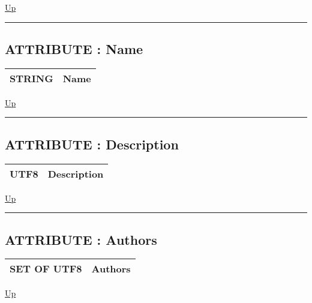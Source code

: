 \hyperlink{ecldoc:BundleBase}{Up}

\par


\rule{\textwidth}{0.4pt}
\subsection*{ATTRIBUTE : Name}
\hypertarget{ecldoc:bundlebase.name}{}

{\renewcommand{\arraystretch}{1.5}
\begin{tabularx}{\textwidth}{|>{\raggedright\arraybackslash}l|X|}
\hline
\hspace{0pt}STRING & Name \\
\hline
\end{tabularx}
}

\hyperlink{ecldoc:BundleBase}{Up}

\par


\rule{\textwidth}{0.4pt}
\subsection*{ATTRIBUTE : Description}
\hypertarget{ecldoc:bundlebase.description}{}

{\renewcommand{\arraystretch}{1.5}
\begin{tabularx}{\textwidth}{|>{\raggedright\arraybackslash}l|X|}
\hline
\hspace{0pt}UTF8 & Description \\
\hline
\end{tabularx}
}

\hyperlink{ecldoc:BundleBase}{Up}

\par


\rule{\textwidth}{0.4pt}
\subsection*{ATTRIBUTE : Authors}
\hypertarget{ecldoc:bundlebase.authors}{}

{\renewcommand{\arraystretch}{1.5}
\begin{tabularx}{\textwidth}{|>{\raggedright\arraybackslash}l|X|}
\hline
\hspace{0pt}SET OF UTF8 & Authors \\
\hline
\end{tabularx}
}

\hyperlink{ecldoc:BundleBase}{Up}

\par


